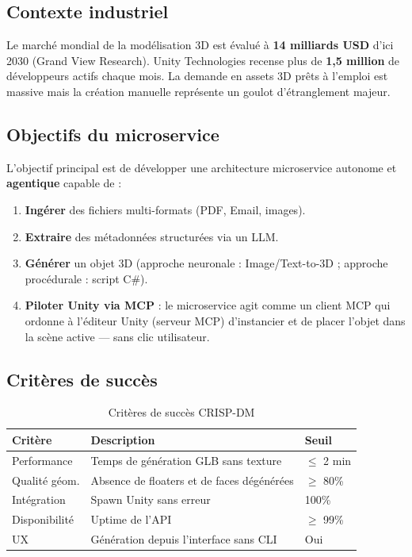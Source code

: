 \documentclass[12pt,a4paper,oneside]{report}
\begin{document}
\subsection{Contexte industriel}
Le marché mondial de la modélisation 3D est évalué à \textbf{14 milliards USD}
d'ici 2030 (Grand View Research). Unity Technologies recense plus de
\textbf{1,5 million} de développeurs actifs chaque mois. La demande en assets
3D prêts à l'emploi est massive mais la création manuelle représente un
goulot d'étranglement majeur.

\subsection{Objectifs du microservice}
L'objectif principal est de développer une architecture microservice autonome
et \textbf{agentique} capable de :
\begin{enumerate}
  \item \textbf{Ingérer} des fichiers multi-formats (PDF, Email, images).
  \item \textbf{Extraire} des métadonnées structurées via un LLM.
  \item \textbf{Générer} un objet 3D (approche neuronale : Image/Text-to-3D ;
        approche procédurale : script C\#).
  \item \textbf{Piloter Unity via MCP} : le microservice agit comme un client
        MCP qui ordonne à l'éditeur Unity (serveur MCP) d'instancier et de
        placer l'objet dans la scène active — sans clic utilisateur.
\end{enumerate}

\subsection{Critères de succès}
\begin{table}[H]
\centering
\caption{Critères de succès CRISP-DM}
\label{tab:success}
\begin{tabularx}{\linewidth}{@{}lXl@{}}
\toprule
\textbf{Critère} & \textbf{Description} & \textbf{Seuil} \\
\midrule
Performance & Temps de génération GLB sans texture & $\leq$ 2 min \\
Qualité géom. & Absence de floaters et de faces dégénérées & $\geq$ 80\% \\
Intégration & Spawn Unity sans erreur & 100\% \\
Disponibilité & Uptime de l'API & $\geq$ 99\% \\
UX & Génération depuis l'interface sans CLI & Oui \\
\bottomrule
\end{tabularx}
\end{table}
\end{document}

